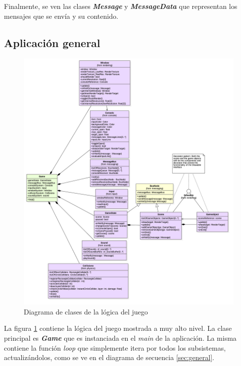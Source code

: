 \bigskip

Finalmente, se ven las clases \textbf{\textit{Message}} y \textbf{\textit{MessageData}} que representan los mensajes que se envía y su contenido.

\subsection{Aplicación general}

\begin{figure}
	\centerline{\includegraphics[width=18cm]{otros/UML/png/alld/png/gamelogic__diagramaDeClases_gamelogic_7.png}}
	\caption{Diagrama de clases de la lógica del juego}
	\label{class:gamelogic}
\end{figure}

La figura \ref{class:gamelogic} contiene la lógica del juego mostrada a muy alto nivel. La clase principal es \textbf{\textit{Game}} que es instanciada en el \textit{main} de la aplicación. La misma contiene la función \textit{loop} que simplemente itera por todos los subsistemas, actualizándolos, como se ve en el diagrama de secuencia \ref{sec:general}. 

